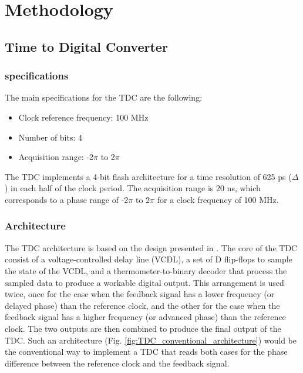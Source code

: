 \chapter{Methodology}
\section{Time to Digital Converter}

\subsection{specifications}
The main specifications for the TDC are the following:
\begin{itemize}
    \item Clock reference frequency: 100 MHz
    \item Number of bits: 4
    \item Acquisition range: -2$\pi$ to 2$\pi$
\end{itemize}

The TDC implements a 4-bit flash architecture for a time resolution of 625 ps ($\Delta$) in each half of the clock period. The acquisition range is 20 ns, which corresponds to a phase 
range of -2$\pi$ to 2$\pi$ for a clock frequency of 100 MHz.

\subsection{Architecture}
The TDC architecture is based on the design presented in \cite{bib:tdc_flash}. The core of the TDC consist of a voltage-controlled delay line (VCDL), a set of D flip-flops to sample the
state of the VCDL, and a thermometer-to-binary decoder that process the sampled data to produce a workable digital output. This arrangement is used twice, once for the case when the
feedback signal has a lower frequency (or delayed phase) than the reference clock, and the other for the case when the feedback signal has a higher frequency (or advanced phase) than
the reference clock. The two outputs are then combined to produce the final output of the TDC. Such an architecture (Fig. \ref{fig:TDC_conventional_architecture}) would be the 
conventional way to implement a TDC that reads both cases for the phase difference between the reference clock and the feedback signal. 

